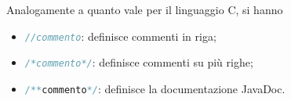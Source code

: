 \documentclass{subfiles}
\begin{document}
    Analogamente a quanto vale per il linguaggio C, si hanno
    \begin{itemize}
        \item \lstinline[language = Java]{//commento}: definisce commenti in riga;
        \item \lstinline[language = Java]{/*commento*/}: definisce commenti su più righe;
        \item \lstinline[language = Java]{/**commento*/}: definisce la documentazione JavaDoc\footnotemark[1].
    \end{itemize}

\end{document}
